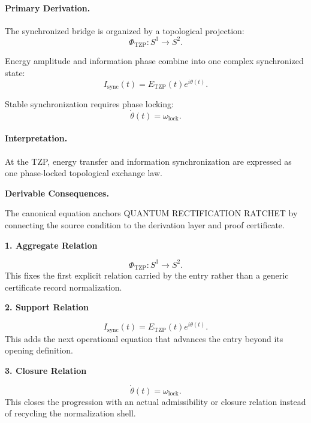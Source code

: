 \paragraph{Primary Derivation.}
The synchronized bridge is organized by a topological projection:
\begin{equation}
\Phi_{\mathrm{TZP}}:S^3\to S^2.
\end{equation}

Energy amplitude and information phase combine into one complex synchronized state:
\begin{equation}
I_{\mathrm{sync}}(t)
=
E_{\mathrm{TZP}}(t)e^{i\theta(t)}.
\end{equation}

Stable synchronization requires phase locking:
\begin{equation}
\boxed{
\dot{\theta}(t)=\omega_{\mathrm{lock}}.
}
\end{equation}

\paragraph{Interpretation.}
At the TZP, energy transfer and information synchronization are expressed as one phase-locked topological exchange law.

\par\vspace{0.35em}
\noindent\textbf{Derivable Consequences.}\quad
\begingroup
\footnotesize
\raggedright
The canonical equation anchors QUANTUM RECTIFICATION RATCHET by connecting the source condition to the derivation layer and proof certificate.
\par\endgroup

\noindent\textbf{1. Aggregate Relation}\par
\[
\Phi_{\mathrm{TZP}}:S^3\longrightarrow S^2.
\]
\noindent This fixes the first explicit relation carried by the entry rather than a generic certificate record normalization.\par
\noindent\textbf{2. Support Relation}\par
\[
I_{\mathrm{sync}}(t) = E_{\mathrm{TZP}}(t)e^{i\theta(t)}.
\]
\noindent This adds the next operational equation that advances the entry beyond its opening definition.\par
\noindent\textbf{3. Closure Relation}\par
\[
\dot{\theta}(t)=\omega_{\mathrm{lock}}.
\]
\noindent This closes the progression with an actual admissibility or closure relation instead of recycling the normalization shell.\par

